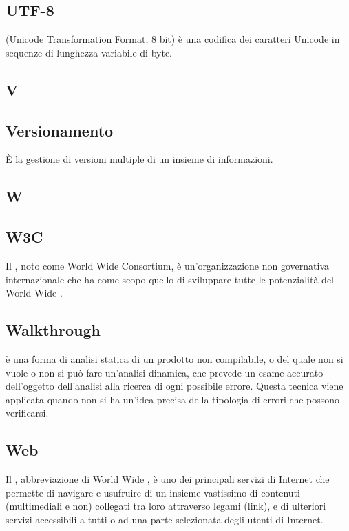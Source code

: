 \subsection*{UTF-8}
 (Unicode Transformation Format, 8 bit) è una codifica dei caratteri Unicode in sequenze di lunghezza variabile di byte.

\newpage

\begin{center}
\Huge\section*{\uppercase{V}}
\end{center}

\subsection*{Versionamento}
È la gestione di versioni multiple di un insieme di informazioni.

\newpage

\begin{center}
\Huge\section*{\uppercase{W}}
\end{center}

\subsection*{W3C}
Il , noto come World Wide  Consortium, è un'organizzazione non governativa internazionale che ha come scopo quello di sviluppare tutte le potenzialità del World Wide .

\subsection*{Walkthrough }
 è una forma di analisi statica di un prodotto non compilabile, o del
quale non si vuole o non si può fare un'analisi dinamica, che prevede un esame accurato
dell'oggetto dell'analisi alla ricerca di ogni possibile errore. Questa tecnica viene applicata
quando non si ha un'idea precisa della tipologia di errori che possono verificarsi.

\subsection*{Web}
Il , abbreviazione di World Wide , è uno dei principali servizi di Internet che permette di navigare e usufruire di un insieme vastissimo di contenuti (multimediali e non) collegati tra loro attraverso legami (link), e di ulteriori servizi accessibili a tutti o ad una parte selezionata degli utenti di Internet.

